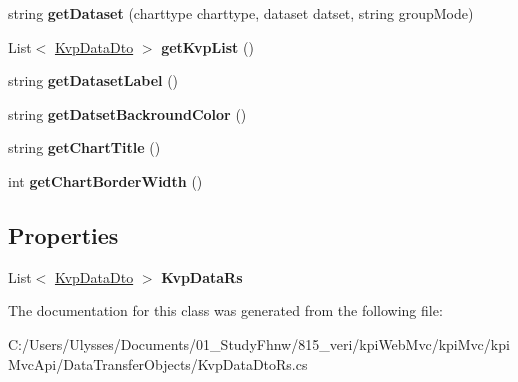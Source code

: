 \begin{DoxyCompactItemize}
string {\bfseries get\+Dataset} (charttype charttype, dataset datset, string group\+Mode)
\item 
\mbox{\label{classkpi_mvc_api_1_1_data_transfer_objects_1_1_kvp_data_dto_rs_ac1bd4b0312a7a0a07b8848d9cdf739da}} 
List$<$ \hyperlink{classkpi_mvc_api_1_1_data_transfer_objects_1_1_kvp_data_dto}{Kvp\+Data\+Dto} $>$ {\bfseries get\+Kvp\+List} ()
\item 
\mbox{\label{classkpi_mvc_api_1_1_data_transfer_objects_1_1_kvp_data_dto_rs_a29e122aca7de38b447056485ad8b4afa}} 
string {\bfseries get\+Dataset\+Label} ()
\item 
\mbox{\label{classkpi_mvc_api_1_1_data_transfer_objects_1_1_kvp_data_dto_rs_ac08415561811e16a01e4fa425709905b}} 
string {\bfseries get\+Datset\+Backround\+Color} ()
\item 
\mbox{\label{classkpi_mvc_api_1_1_data_transfer_objects_1_1_kvp_data_dto_rs_ac1a9b5ca7012ddd12549e157929f23e7}} 
string {\bfseries get\+Chart\+Title} ()
\item 
\mbox{\label{classkpi_mvc_api_1_1_data_transfer_objects_1_1_kvp_data_dto_rs_afcb6b42bf6a7f8271efc95f671bc9e08}} 
int {\bfseries get\+Chart\+Border\+Width} ()
\end{DoxyCompactItemize}
\subsection*{Properties}
\begin{DoxyCompactItemize}
\item 
\mbox{\label{classkpi_mvc_api_1_1_data_transfer_objects_1_1_kvp_data_dto_rs_ae4c7dbba98cf290c43fdbce4172b6ca1}} 
List$<$ \hyperlink{classkpi_mvc_api_1_1_data_transfer_objects_1_1_kvp_data_dto}{Kvp\+Data\+Dto} $>$ {\bfseries Kvp\+Data\+Rs}
\end{DoxyCompactItemize}


The documentation for this class was generated from the following file\+:\begin{DoxyCompactItemize}
\item 
C\+:/\+Users/\+Ulysses/\+Documents/01\+\_\+\+Study\+Fhnw/815\+\_\+veri/kpi\+Web\+Mvc/kpi\+Mvc/kpi\+Mvc\+Api/\+Data\+Transfer\+Objects/Kvp\+Data\+Dto\+Rs.\+cs\end{DoxyCompactItemize}
